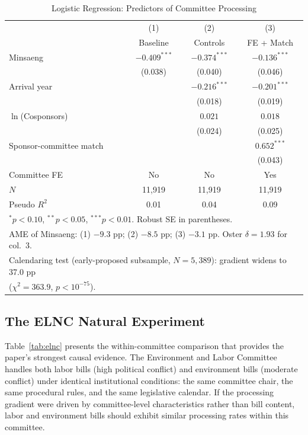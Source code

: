 \documentclass[11pt]{article}
\begin{document}
\begin{table}[H]
\centering
\caption{Logistic Regression: Predictors of Committee Processing}
\label{tab:main}
\begin{tabular}{lccc}
\toprule
& (1) & (2) & (3) \\
& Baseline & Controls & FE + Match \\
\midrule
Minsaeng & $-0.409^{***}$ & $-0.374^{***}$ & $-0.136^{***}$ \\
& (0.038) & (0.040) & (0.046) \\
Arrival year & & $-0.216^{***}$ & $-0.201^{***}$ \\
& & (0.018) & (0.019) \\
$\ln$(Cosponsors) & & $0.021$ & $0.018$ \\
& & (0.024) & (0.025) \\
Sponsor-committee match & & & $0.652^{***}$ \\
& & & (0.043) \\
\midrule
Committee FE & No & No & Yes \\
$N$ & 11,919 & 11,919 & 11,919 \\
Pseudo $R^2$ & 0.01 & 0.04 & 0.09 \\
\bottomrule
\multicolumn{4}{l}{\footnotesize $^*p<0.10$, $^{**}p<0.05$, $^{***}p<0.01$. Robust SE in parentheses.} \\
\multicolumn{4}{l}{\footnotesize AME of Minsaeng: (1) $-9.3$ pp; (2) $-8.5$ pp; (3) $-3.1$ pp. Oster $\delta = 1.93$ for col.\ 3.} \\
\multicolumn{4}{l}{\footnotesize Calendaring test (early-proposed subsample, $N = 5{,}389$): gradient widens to 37.0 pp} \\
\multicolumn{4}{l}{\footnotesize ($\chi^2 = 363.9$, $p < 10^{-75}$).} \\
\end{tabular}
\end{table}

\subsection{The ELNC Natural Experiment}

Table~\ref{tab:elnc} presents the within-committee comparison that provides the paper's strongest causal evidence. The Environment and Labor Committee handles both labor bills (high political conflict) and environment bills (moderate conflict) under identical institutional conditions: the same committee chair, the same procedural rules, and the same legislative calendar. If the processing gradient were driven by committee-level characteristics rather than bill content, labor and environment bills should exhibit similar processing rates within this committee.
\end{document}
